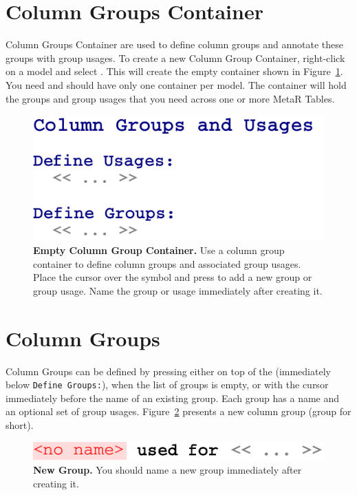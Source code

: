 \section{Column Groups Container}\label{sec:ColumnGroupContainer}
Column Groups Container are used to define column groups and annotate these groups with group usages.
To create a new Column Group Container, right-click on a model and select . This will create the empty container shown in Figure~\ref{fig:NewColumnGroupContainer}. You need and should have only one container per model. The container will hold the groups and group usages that you need across one or more MetaR Tables.
\begin{figure}
  \centering
  \includegraphics[width=\figWidthNarrow]{figures/NewColumnGroupContainer.pdf}
\caption[Empty Column Group Container.]{\textbf{Empty Column Group Container.} Use a column group container to define column groups and associated group usages. Place the cursor over the \mpsplaceholder{} symbol and press \keys{\return} to add a new group or group usage. Name the group or usage immediately after creating it.}
\label{fig:NewColumnGroupContainer}
\end{figure}

\section{Column Groups}
Column Groups can be defined by pressing \keys{\return} either on top of the \mpsplaceholder{} (immediately below \texttt{Define Groups:}), when the list of groups is empty, or with the cursor immediately before the name of an existing group. Each group has a name and an optional set of group usages. Figure~\ref{fig:NewGroup} presents a new column group (group for short).

\begin{figure}
  \centering
  \includegraphics[width=\figWidthNarrow]{figures/NewGroup.pdf}
\caption[New Group.]{\textbf{New Group.} You should name a new group immediately after creating it.}
\label{fig:NewGroup}
\end{figure}

